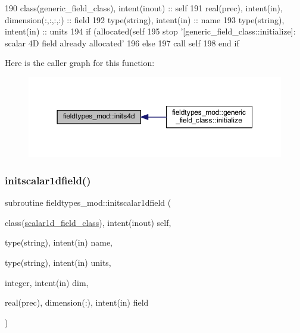 \begin{DoxyCode}
190     \textcolor{keywordtype}{class}(generic\_field\_class), \textcolor{keywordtype}{intent(inout)} :: self
191     \textcolor{keywordtype}{real(prec)}, \textcolor{keywordtype}{intent(in)}, \textcolor{keywordtype}{dimension(:,:,:,:)} :: field
192     \textcolor{keywordtype}{type}(string), \textcolor{keywordtype}{intent(in)} :: name
193     \textcolor{keywordtype}{type}(string), \textcolor{keywordtype}{intent(in)} :: units
194     \textcolor{keywordflow}{if} (\textcolor{keyword}{allocated}(self%
195         stop \textcolor{stringliteral}{'[generic\_field\_class::initialize]: scalar 4D field already allocated'}
196     \textcolor{keywordflow}{else}
197         \textcolor{keyword}{call }self%
198 \textcolor{keywordflow}{    end if}
\end{DoxyCode}
Here is the caller graph for this function\+:\nopagebreak
\begin{figure}[H]
\begin{center}
\leavevmode
\includegraphics[width=350pt]{namespacefieldtypes__mod_a1987bd94293cfd9e35016ac5992501cd_icgraph}
\end{center}
\end{figure}
\mbox{\label{namespacefieldtypes__mod_a96ff5318da6a7db8bb61c525315c1c89}} 
\subsubsection{\texorpdfstring{initscalar1dfield()}{initscalar1dfield()}}
{\footnotesize\ttfamily subroutine fieldtypes\+\_\+mod\+::initscalar1dfield (\begin{DoxyParamCaption}\item[{class(\mbox{\hyperlink{structfieldtypes__mod_1_1scalar1d__field__class}{scalar1d\+\_\+field\+\_\+class}}), intent(inout)}]{self,  }\item[{type(string), intent(in)}]{name,  }\item[{type(string), intent(in)}]{units,  }\item[{integer, intent(in)}]{dim,  }\item[{real(prec), dimension(\+:), intent(in)}]{field }\end{DoxyParamCaption})\hspace{0.3cm}{\ttfamily [private]}}



